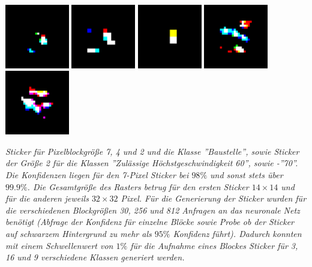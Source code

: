 \documentclass[11pt]{article} %
\begin{document}
\begin{threeparttable}
\includegraphics[height=2.8cm]{2_block25_0_010_99999928}
\includegraphics[height=2.8cm]{4_block25_0_010_99999976}
\includegraphics[height=2.8cm]{7_block_central0_010_98064834}
\includegraphics[height=2.8cm]{2_block3_0_011_0}
\includegraphics[height=2.8cm]{2_block4_0_010_99945539}
\begin{tablenotes}
\footnotesize 
\item\textit{ Sticker für Pixelblockgröße 7, 4 und 2 und die Klasse ''Baustelle'', sowie Sticker der Größe 2 für die Klassen ''Zulässige Höchstgeschwindigkeit 60'', sowie -''70''. Die Konfidenzen liegen für den 7-Pixel Sticker bei $98\%$ und sonst stets über $99.9\%$.
Die Gesamtgröße des Rasters betrug für den ersten Sticker $14\times14$ und für die anderen jeweils $32\times32$ Pixel. Für die Generierung der Sticker wurden für die verschiedenen Blockgrößen 30, 256 und 812 Anfragen an das neuronale Netz benötigt (Abfrage der Konfidenz für einzelne Blöcke sowie Probe ob der Sticker auf schwarzem Hintergrund zu mehr als $95\%$ Konfidenz führt). Dadurch konnten mit einem Schwellenwert von $1\%$ für die Aufnahme eines Blockes Sticker für 3, 16 und 9 verschiedene Klassen generiert werden. }
\end{tablenotes}
\end{threeparttable}
\\  
\end{document}
